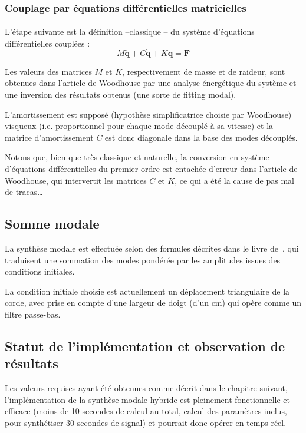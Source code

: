 \subsubsection{Couplage par équations différentielles matricielles}

  \paragraph*{}
  L'étape suivante est la définition --classique -- du système d'équations
différentielles cou\-plées :
\[ M \ddot{\bm{q}} + C \dot{\bm{q}} + K \bm{q} = \bm{F} \]

  Les valeurs des matrices \( M \) et \( K \), respectivement de masse et de
raideur, sont obtenues dans l'article de Woodhouse par une analyse énergétique
du système et une inversion des résultats obtenus (une sorte de fitting modal).

  L'amortissement est supposé (hypothèse simplificatrice choisie par Woodhouse)
visqueux (i.e. proportionnel pour chaque mode découplé à sa vitesse) et la
matrice d'amortissement \( C \) est donc diagonale dans la base des
modes découplés.

Notons que, bien que très classique et naturelle, la conversion en système
d'équations différentielles du premier ordre est entachée d'erreur dans
l'article de Woodhouse, qui intervertit les matrices \( C \) et \( K \), ce
qui a été la cause de pas mal de tracas\dots

\subsection{Somme modale}

  La synthèse modale est effectuée selon des formules décrites
dans le livre de~\textcite{newland}, qui traduisent une sommation des modes
pondérée par les amplitudes issues des conditions initiales.

  La condition initiale choisie est actuellement un déplacement triangulaire
de la corde, avec prise en compte d'une largeur de doigt (d'un \( \si{\cm} \))
qui opère comme un filtre passe-bas.

\subsection{Statut de l'implémentation et observation de résultats}

Les valeurs requises ayant été obtenues comme décrit dans le chapitre suivant,
l'implémentation de la synthèse modale hybride est pleinement fonctionnelle
et efficace (moins de 10 secondes de calcul au total, calcul des paramètres
inclus, pour synthétiser 30 secondes de signal) et pourrait donc opérer en
temps réel.

